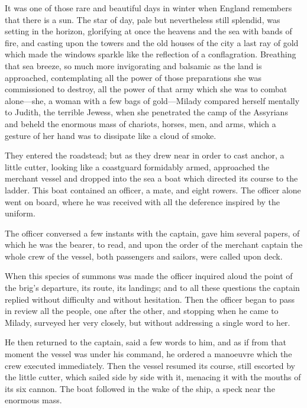 It was one of those rare and beautiful days in winter when England remembers that there is a sun. The star of day, pale but nevertheless still splendid, was setting in the horizon, glorifying at once the heavens and the sea with bands of fire, and casting upon the towers and the old houses of the city a last ray of gold which made the windows sparkle like the reflection of a conflagration. Breathing that sea breeze, so much more invigorating and balsamic as the land is approached, contemplating all the power of those preparations she was commissioned to destroy, all the power of that army which she was to combat alone---she, a woman with a few bags of gold---Milady compared herself mentally to Judith, the terrible Jewess, when she penetrated the camp of the Assyrians and beheld the enormous mass of chariots, horses, men, and arms, which a gesture of her hand was to dissipate like a cloud of smoke. 

They entered the roadstead; but as they drew near in order to cast anchor, a little cutter, looking like a coastguard formidably armed, approached the merchant vessel and dropped into the sea a boat which directed its course to the ladder. This boat contained an officer, a mate, and eight rowers. The officer alone went on board, where he was received with all the deference inspired by the uniform. 

The officer conversed a few instants with the captain, gave him several papers, of which he was the bearer, to read, and upon the order of the merchant captain the whole crew of the vessel, both passengers and sailors, were called upon deck. 

When this species of summons was made the officer inquired aloud the point of the brig's departure, its route, its landings; and to all these questions the captain replied without difficulty and without hesitation. Then the officer began to pass in review all the people, one after the other, and stopping when he came to Milady, surveyed her very closely, but without addressing a single word to her. 

He then returned to the captain, said a few words to him, and as if from that moment the vessel was under his command, he ordered a manoeuvre which the crew executed immediately. Then the vessel resumed its course, still escorted by the little cutter, which sailed side by side with it, menacing it with the mouths of its six cannon. The boat followed in the wake of the ship, a speck near the enormous mass. 

